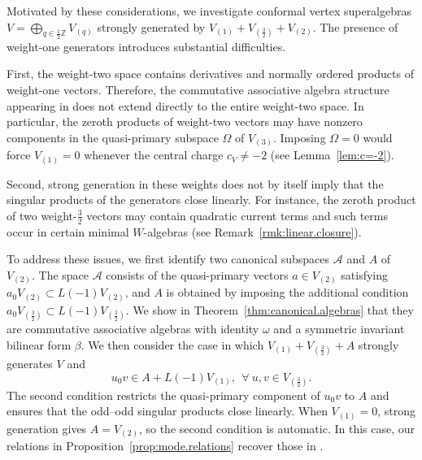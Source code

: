 \documentclass[12pt]{article}
\numberwithin{equation}{section}
\theoremstyle{definition}
\theoremstyle{plain}
\newcommand{\bZ}{\ensuremath{\mathbb{Z}}}
\newcommand{\cA}{\ensuremath{\mathcal{A}}}
\begin{document}
Motivated by these considerations, we investigate conformal vertex superalgebras $V=\bigoplus_{q\in\frac12\bZ}V_{(q)}$ strongly generated by $V_{(1)}+V_{(\frac32)}+V_{(2)}$. The presence of weight-one generators introduces substantial difficulties. 

First, the weight-two space contains derivatives and normally ordered products of weight-one vectors. Therefore, the commutative associative algebra structure appearing in \cite{Lam,LY} does not extend directly to the entire weight-two space. In particular, the zeroth products of weight-two vectors may have nonzero components in the quasi-primary subspace $\Omega$ of $V_{(3)}$. Imposing $\Omega=0$ would force $V_{(1)}=0$ whenever the central charge $c_V\neq-2$ (see Lemma~\ref{lem:c=-2}). 

Second, strong generation in these weights does not by itself imply that the singular products of the generators close linearly. For instance, the zeroth product of two weight-$\frac32$ vectors may contain quadratic current terms and such terms occur in certain minimal $W$-algebras (see Remark~\ref{rmk:linear.closure}).

To address these issues, we first identify two canonical subspaces $\cA$ and $A$ of $V_{(2)}$. The space $\cA$ consists of the quasi-primary vectors $a\in V_{(2)}$ satisfying $a_0V_{(2)}\subset L(-1)V_{(2)}$, and $A$ is obtained by imposing
the additional condition $a_0V_{(\frac{3}{2})}\subset L(-1)V_{(\frac{3}{2})}$. We show in Theorem~\ref{thm:canonical.algebras} that they are commutative associative algebras with identity $\omega$ and a symmetric invariant bilinear form $\beta$. We then consider the case in which $V_{(1)}+V_{(\frac{3}{2})}+A$ strongly generates $V$ and
\[
    u_0v\in A+L(-1)V_{(1)},\ \ \forall\ u,v\in V_{(\frac{3}{2})}.
\]
The second condition restricts the quasi-primary component of $u_0v$ to $A$ and ensures that the odd--odd singular products close linearly. When $V_{(1)}=0$, strong generation gives $A=V_{(2)}$, so the second condition is automatic. In this case, our relations in Proposition~\ref{prop:mode.relations} recover those in \cite{LY}. 
\end{document}
